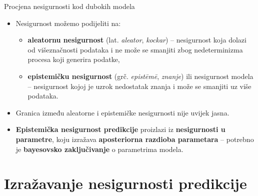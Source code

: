\documentclass{beamer}
\begin{document}
\begin{frame}{Procjena nesigurnosti kod dubokih modela}
	\begin{itemize}
		\item Nesigurnost možemo podijeliti \citep{Kiureghian:2009:AEDM} na: 
		\begin{itemize}
			\item \textbf{aleatornu nesigurnost} (lat. \textit{aleator}, \textit{kockar}) -- nesigurnost koja dolazi od višeznačnosti podataka i ne može se smanjiti zbog nedeterminizma procesa koji generira podatke,
			\item \textbf{epistemičku nesigurnost} (grč. \textit{epist\={e}m\={e}}, \textit{znanje}) ili nesigurnost modela -- nesigurnost kojoj je uzrok nedostatak znanja i može se smanjiti uz više podataka.
		\end{itemize}
		\item Granica između aleatorne i epistemičke nesigurnosti nije uvijek jasna.
		\item \textbf{Epistemička nesigurnost predikcije} proizlazi iz \textbf{nesigurnosti u parametre}, koju izražava \textbf{aposteriorna razdioba parametara} -- potrebno je \textbf{bayesovsko zaključivanje} o parametrima modela.
	\end{itemize}
\end{frame}

\section{Izražavanje nesigurnosti predikcije}
\end{document}
